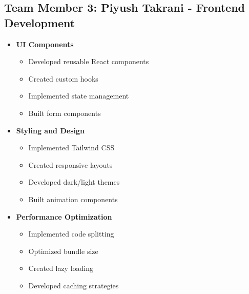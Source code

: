 \documentclass[12pt,a4paper]{report}
\begin{document}
\subsection{Team Member 3: Piyush Takrani - Frontend Development}
\begin{itemize}
    \item \textbf{UI Components}
    \begin{itemize}
        \item Developed reusable React components
        \item Created custom hooks
        \item Implemented state management
        \item Built form components
    \end{itemize}
    
    \item \textbf{Styling and Design}
    \begin{itemize}
        \item Implemented Tailwind CSS
        \item Created responsive layouts
        \item Developed dark/light themes
        \item Built animation components
    \end{itemize}
    
    \item \textbf{Performance Optimization}
    \begin{itemize}
        \item Implemented code splitting
        \item Optimized bundle size
        \item Created lazy loading
        \item Developed caching strategies
    \end{itemize}
\end{itemize}
\end{document}
